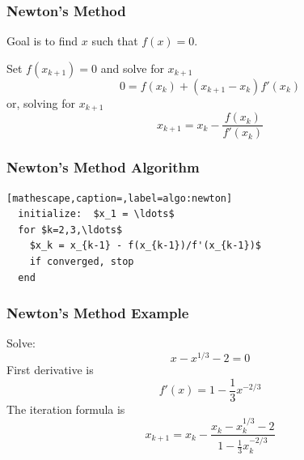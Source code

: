 \documentclass[10pt]{beamer}
\begin{document}
\begin{frame}
\frametitle{Newton's Method}


Goal is to find $x$ such that $f(x) = 0$.

Set $f(x_{k+1}) = 0$ and solve for $x_{k+1}$
\begin{equation*}
    0 = f(x_k) + \left( x_{k+1} - x_k \right) f'(x_k)
\end{equation*}
or, solving for $x_{k+1}$
\begin{equation*}
    \boxed{
        x_{k+1} = x_k - \frac{f(x_k)}{f'(x_k)}
    }
\end{equation*}



\end{frame}
\begin{frame}[fragile]
\frametitle{Newton's Method Algorithm}

\begin{lstlisting}[mathescape,caption=,label=algo:newton]
  initialize:  $x_1 = \ldots$                      
  for $k=2,3,\ldots$                               
    $x_k = x_{k-1} - f(x_{k-1})/f'(x_{k-1})$       
    if converged, stop       
  end
\end{lstlisting}



\end{frame}
\begin{frame}
\frametitle{Newton's Method Example}

Solve:
\begin{equation*}
    x - x^{1/3} - 2 = 0
\end{equation*}
First derivative is
\begin{equation*}
    f'(x) = 1 - \frac{1}{3}x^{-2/3}
\end{equation*}
The iteration formula is
\begin{equation*}
    x_{k+1} = x_k - \frac{x_k - x_k^{1/3} - 2}{1 - \frac{1}{3}x_k^{-2/3}}
\end{equation*}


\end{frame}
\end{document}

